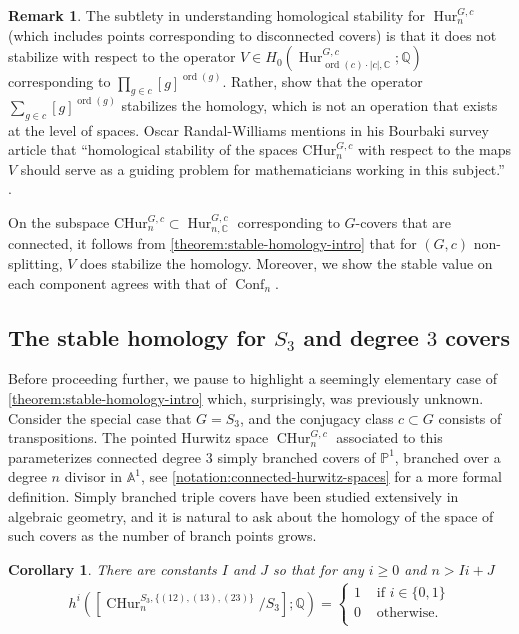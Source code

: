 \documentclass[12 pt]{amsart}
\theoremstyle{plain}
\newtheorem{corollary}[theorem]{Corollary}
\theoremstyle{definition}
\newtheorem{remark}[theorem]{Remark}
\theoremstyle{remark}
\numberwithin{equation}{section}
\DeclareMathOperator\Hur{Hur}
\DeclareMathOperator\Conf{Conf}
\DeclareMathOperator\ord{ord}
\newcommand{\phur}[4]{\operatorname{Hur}^{#1, #3}_{#2,#4}}
\newcommand{\churc}[3]{[\operatorname{CHur}^{#1, #3}_{#2}/#1]}
\newcommand{\cphurc}[3]{\operatorname{CHur}^{#1, #3}_{#2}}
\begin{document}
\begin{remark}
	\label{remark:orw}
	The subtlety in understanding homological stability for $\Hur_{n}^{G,c}$ (which includes points corresponding to disconnected
	covers) is that it does not stabilize with respect to the 
	operator $V\in H_0(\phur G {\ord(c) \cdot |c|} c {\mathbb
		C};
	\mathbb Q)$ corresponding to $\prod_{g \in c} [g]^{\ord(g)}$. Rather,
	\cite{EllenbergVW:cohenLenstra} show that the operator $\sum_{g \in c}
	[g]^{\ord(g)}$ stabilizes the homology, which is not an operation that exists at the level of spaces. 
	Oscar Randal-Williams mentions in his Bourbaki survey article that
	``homological stability of the spaces $\mathrm{CHur}_{n}^{G,c}$ with respect to the maps
$V$ should serve as a guiding problem for mathematicians working in this
subject.''
\cite[p. 24]{randal-williams:homology-of-hurwitz-spaces}.

On the subspace $\mathrm{CHur}_{n}^{G,c}\subset \Hur_{n, \mathbb
	C}^{G,c}$ corresponding to $G$-covers that are connected, it follows from \autoref{theorem:stable-homology-intro}
	that for $(G,c)$ non-splitting,
	$V$ does stabilize the homology. Moreover, we show the stable value on each component agrees with that of $\Conf_n$.
\end{remark}


\subsection{The stable homology for $S_3$ and degree $3$ covers}
Before proceeding further, we pause to highlight a seemingly elementary case of
\autoref{theorem:stable-homology-intro} which, surprisingly, was previously unknown.
Consider the special case that $G = S_3$, and the conjugacy class $c \subset G$
consists of transpositions. The pointed Hurwitz space $\cphurc G n c $ 
associated to this parameterizes
connected degree $3$ simply branched covers of $\mathbb P^1$,
branched over a degree $n$ divisor in $\mathbb A^1$,
see \autoref{notation:connected-hurwitz-spaces} for a more formal definition.
Simply branched triple covers have been studied extensively in algebraic
geometry, and it is natural to ask about the homology of the space of such
covers as the number of branch points grows.

\begin{corollary}
	\label{corollary:s3-homology}
	There are constants $I$ and $J$ so that for any $i \geq 0$ and $n > I i + J$
	\begin{align*}
		h^i(\churc {S_3} n { \{(12),(13),(23)\}} ; \mathbb Q) =
		\begin{cases}
			1 & \text{ if } i \in \{0,1\} \\
			0 & \text{ otherwise. }  \\
		\end{cases}
	\end{align*}
\end{corollary}
\end{document}
